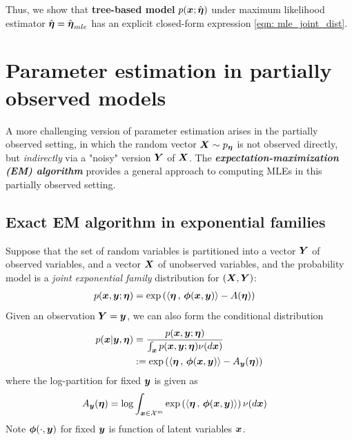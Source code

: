 \documentclass[11pt]{article}
\begin{document}
Thus, we show that \textbf{tree-based model} $p(\boldsymbol{x}; \hat{\boldsymbol{\eta}})$ under maximum likelihood estimator $\hat{\boldsymbol{\eta}} = \hat{\boldsymbol{\eta}}_{mle}$ has an explicit closed-form expression \eqref{eqn: mle_joint_dist}. 



\newpage
\section{Parameter estimation in partially observed models}
A more challenging version of parameter estimation arises in the partially observed setting, in which the random vector $\boldsymbol{X} \sim p_{\boldsymbol{\eta}}$ is not
observed directly, but \emph{indirectly} via a "noisy" version $\boldsymbol{Y}$ of $\boldsymbol{X}$. The \emph{\textbf{expectation-maximization (EM) algorithm}} provides a general approach to computing MLEs in this partially observed setting. 
\subsection{Exact EM algorithm in exponential families}
Suppose that the set of random variables is partitioned into a vector $\boldsymbol{Y}$ of observed variables, and a vector $\boldsymbol{X}$ of unobserved variables, and the
probability model is a \emph{joint exponential family} distribution for $(\boldsymbol{X},\boldsymbol{Y})$:
\begin{align}
p(\boldsymbol{x}, \boldsymbol{y}; \boldsymbol{\eta}) &= \exp\left(\left\langle \boldsymbol{\eta}\,,\, \boldsymbol{\phi}(\boldsymbol{x}, \boldsymbol{y}) \right\rangle - A(\boldsymbol{\eta})\right) \label{eqn: latent_exp_joint}
\end{align} Given an observation $\boldsymbol{Y} = \boldsymbol{y}$, we can also form the conditional distribution
\begin{align}
p(\boldsymbol{x} | \boldsymbol{y},  \boldsymbol{\eta}) &= \frac{p(\boldsymbol{x}, \boldsymbol{y}; \boldsymbol{\eta})}{\int_{\boldsymbol{x}}p(\boldsymbol{x}, \boldsymbol{y}; \boldsymbol{\eta}) \nu(d\boldsymbol{x})} \nonumber \\
&:= \exp\left(\left\langle \boldsymbol{\eta}\,,\, \boldsymbol{\phi}(\boldsymbol{x}, \boldsymbol{y}) \right\rangle - A_{\boldsymbol{y}}(\boldsymbol{\eta})\right) \label{eqn: latent_exp_conditional}
\end{align} where the log-partition for fixed $\boldsymbol{y}$ is given as 
\begin{align}
A_{\boldsymbol{y}}(\boldsymbol{\eta}) &= \log\int_{\boldsymbol{x} \in {\mathcal X}^{m}} \exp\left(\left\langle \boldsymbol{\eta}\,,\, \boldsymbol{\phi}(\boldsymbol{x}, \boldsymbol{y}) \right\rangle\right) \nu(d\boldsymbol{x})  \label{eqn: latent_log_partition}
\end{align} Note $\boldsymbol{\phi}(\cdot, \boldsymbol{y})$ for fixed $\boldsymbol{y}$ is function of latent variables $\boldsymbol{x}$.
\end{document}
